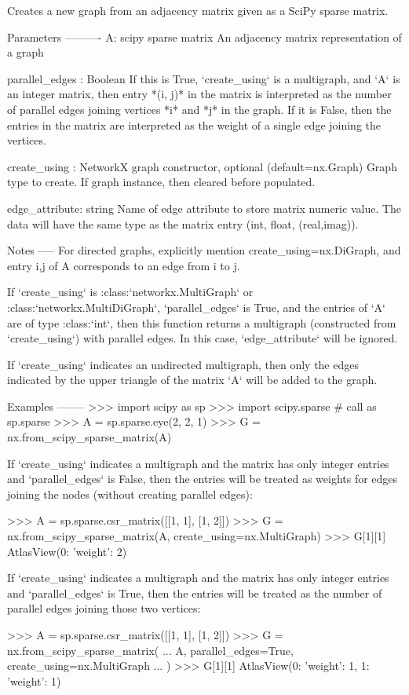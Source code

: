 \begin{DoxyVerb}Creates a new graph from an adjacency matrix given as a SciPy sparse
matrix.

Parameters
----------
A: scipy sparse matrix
  An adjacency matrix representation of a graph

parallel_edges : Boolean
  If this is True, `create_using` is a multigraph, and `A` is an
  integer matrix, then entry *(i, j)* in the matrix is interpreted as the
  number of parallel edges joining vertices *i* and *j* in the graph.
  If it is False, then the entries in the matrix are interpreted as
  the weight of a single edge joining the vertices.

create_using : NetworkX graph constructor, optional (default=nx.Graph)
   Graph type to create. If graph instance, then cleared before populated.

edge_attribute: string
   Name of edge attribute to store matrix numeric value. The data will
   have the same type as the matrix entry (int, float, (real,imag)).

Notes
-----
For directed graphs, explicitly mention create_using=nx.DiGraph,
and entry i,j of A corresponds to an edge from i to j.

If `create_using` is :class:`networkx.MultiGraph` or
:class:`networkx.MultiDiGraph`, `parallel_edges` is True, and the
entries of `A` are of type :class:`int`, then this function returns a
multigraph (constructed from `create_using`) with parallel edges.
In this case, `edge_attribute` will be ignored.

If `create_using` indicates an undirected multigraph, then only the edges
indicated by the upper triangle of the matrix `A` will be added to the
graph.

Examples
--------
>>> import scipy as sp
>>> import scipy.sparse  # call as sp.sparse
>>> A = sp.sparse.eye(2, 2, 1)
>>> G = nx.from_scipy_sparse_matrix(A)

If `create_using` indicates a multigraph and the matrix has only integer
entries and `parallel_edges` is False, then the entries will be treated
as weights for edges joining the nodes (without creating parallel edges):

>>> A = sp.sparse.csr_matrix([[1, 1], [1, 2]])
>>> G = nx.from_scipy_sparse_matrix(A, create_using=nx.MultiGraph)
>>> G[1][1]
AtlasView({0: {'weight': 2}})

If `create_using` indicates a multigraph and the matrix has only integer
entries and `parallel_edges` is True, then the entries will be treated
as the number of parallel edges joining those two vertices:

>>> A = sp.sparse.csr_matrix([[1, 1], [1, 2]])
>>> G = nx.from_scipy_sparse_matrix(
...     A, parallel_edges=True, create_using=nx.MultiGraph
... )
>>> G[1][1]
AtlasView({0: {'weight': 1}, 1: {'weight': 1}})\end{DoxyVerb}
 \mbox{\label{namespacenetworkx_1_1convert__matrix_acff6b353b4693143c1fad4d2c1c7a335}} 
